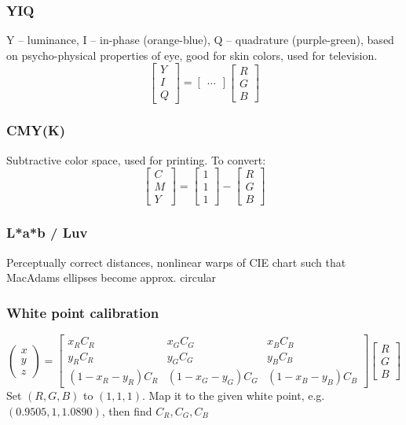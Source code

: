 \documentclass[a4paper,10pt]{article}
\begin{document}
\subsubsection{YIQ}
Y -- luminance, I -- in-phase (orange-blue), Q -- quadrature (purple-green), based on psycho-physical properties of eye, good for skin colors, used for television.
\[\left[\begin{smallmatrix} Y \\ I \\ Q \end{smallmatrix}\right] = \left[\begin{smallmatrix} \dots \end{smallmatrix}\right] \left[\begin{smallmatrix} R \\ G \\ B \end{smallmatrix}\right]\]

\subsubsection{CMY(K)}
Subtractive color space, used for printing. To convert:
\[\left[\begin{smallmatrix} C \\ M \\ Y \end{smallmatrix}\right] = \left[\begin{smallmatrix} 1 \\ 1 \\ 1 \end{smallmatrix}\right] - \left[\begin{smallmatrix} R \\ G \\ B \end{smallmatrix}\right]\]
\subsubsection{L*a*b / Luv} Perceptually correct distances, nonlinear warps of CIE chart such that MacAdams ellipses become approx. circular

\subsubsection{White point calibration}
\[\left(\begin{smallmatrix} x \\ y \\ z \end{smallmatrix}\right) = \left[\begin{smallmatrix} x_R C_R & x_G C_G & x_B C_B \\ y_R C_R & y_G C_G & y_B C_B \\ (1-x_R-y_R)C_R & (1-x_G-y_G)C_G & (1-x_B-y_B)C_B \end{smallmatrix}\right] \left[\begin{smallmatrix}R\\G\\B\end{smallmatrix}\right]\] 
Set \((R, G, B) \) to \( (1,1,1) \). Map it to the given white point, e.g. \( (0.9505, 1, 1.0890) \), then find \( C_R, C_G, C_B \)
\end{document}
